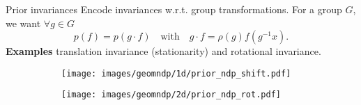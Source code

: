 \begin{frame}{Prior invariances}
Encode invariances w.r.t. group transformations. For a group $G$, we want $\forall g \in G$
\begin{equation*}
p(f) = p(g\cdot f) \quad\text{with}\quad g \cdot f = \rho(g) f (g^{-1} x).
\end{equation*}
\pause
\textbf{Examples} translation invariance (stationarity) and rotational invariance.
\begin{figure}[t]
\centering
\begin{subfigure}[b]{0.45\textwidth}
\centering
\texttt{[image: images/geomndp/1d/prior\_ndp\_shift.pdf]}
\end{subfigure}%
\hspace{0.3cm}
\begin{subfigure}[b]{0.45\textwidth}
\centering
\texttt{[image: images/geomndp/2d/prior\_ndp\_rot.pdf]}
\vspace{-.75em}
\end{subfigure}
\label{fig:prior_model}
\end{figure}
\end{frame}

